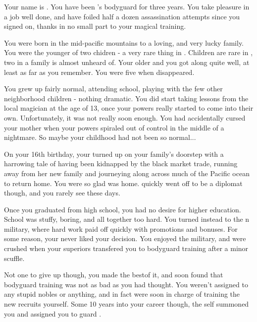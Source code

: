 \documentclass[char]{NeptuneBall}
\begin{document}
\name{\cBodyguard{}}

Your name is \cBodyguard{}. You have been \cPrince{}'s bodyguard for three years. You take pleasure in a job well done, and have foiled half a dozen assassination attempts since you signed on, thanks in no small part to your magical training.

You were born in the mid-pacific mountains to a loving, and very lucky family. You were the younger of two chidren - a very rare thing in \pPacifica{}. Children are rare in \pPacifica{}, two in a family is almost unheard of. Your older \cSpy{\sibling} \cSpy{} and you got along quite well, at least as far as you remember. You were five when \cSpy{\they} disappeared. 

You grew up fairly normal, attending school, playing with the few other neighborhood children - nothing dramatic. You did start taking lessons from the local magician at the age of 13, once your powers really started to come into their own. Unfortunately, it was not really soon enough.  You had accidentally cursed your mother when your powers spiraled out of control in the middle of a nightmare. So maybe your childhood had not been so normal...

On your 16th birthday, your \cSpy{\sibling} turned up on your family's doorstep with a harrowing tale of having been kidnapped by the black market trade, running away from her new family and journeying along across much of the Pacific ocean to return home. You were so glad \cSpy{\they} was home. \cSpy{\They} quickly went off to be a diplomat though, and you rarely see \cSpy{\them} these days.

Once you graduated from high school, you had no desire for higher education. School was stuffy, boring, and all together too hard. You turned instead to the \pPacifica{}n military, where hard work paid off quickly with promotions and bonuses. For some reason, your \cSpy{\sibling} never liked your decision. You enjoyed the military, and were crushed when your superiors transfered you to bodyguard training after a minor scuffle.

Not one to give up though, you made the bestof it, and soon found that bodyguard training was not as bad as you had thought. You weren't assigned to any stupid nobles or anything, and in fact were soon in charge of training the new recruits yourself. Some 10 years into your career though, the \cPacificanRuler{\King} \cPacificanRuler{\them}self summoned you and assigned you to guard \cPacificanRuler{\them} \cPrince{\offspring} \cPrince{}.
\end{document}
